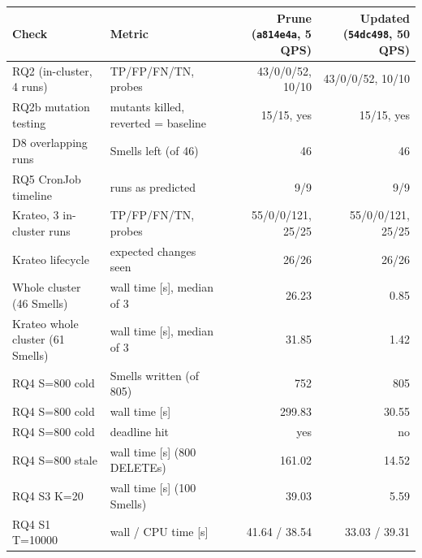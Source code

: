 \begin{tabular}{llrr}
\toprule
Check & Metric & Prune (\texttt{a814e4a}, 5 QPS) & Updated (\texttt{54dc498}, 50 QPS) \\
\midrule
RQ2 (in-cluster, 4 runs) & TP/FP/FN/TN, probes & 43/0/0/52, 10/10 & 43/0/0/52, 10/10 \\
RQ2b mutation testing & mutants killed, reverted = baseline & 15/15, yes & 15/15, yes \\
D8 overlapping runs & Smells left (of 46) & 46 & 46 \\
RQ5 CronJob timeline & runs as predicted & 9/9 & 9/9 \\
Krateo, 3 in-cluster runs & TP/FP/FN/TN, probes & 55/0/0/121, 25/25 & 55/0/0/121, 25/25 \\
Krateo lifecycle & expected changes seen & 26/26 & 26/26 \\
Whole cluster (46 Smells) & wall time [s], median of 3 & 26.23 & 0.85 \\
Krateo whole cluster (61 Smells) & wall time [s], median of 3 & 31.85 & 1.42 \\
RQ4 S=800 cold & Smells written (of 805) & 752 & 805 \\
RQ4 S=800 cold & wall time [s] & 299.83 & 30.55 \\
RQ4 S=800 cold & deadline hit & yes & no \\
RQ4 S=800 stale & wall time [s] (800 DELETEs) & 161.02 & 14.52 \\
RQ4 S3 K=20 & wall time [s] (100 Smells) & 39.03 & 5.59 \\
RQ4 S1 T=10000 & wall / CPU time [s] & 41.64 / 38.54 & 33.03 / 39.31 \\
\bottomrule
\end{tabular}
